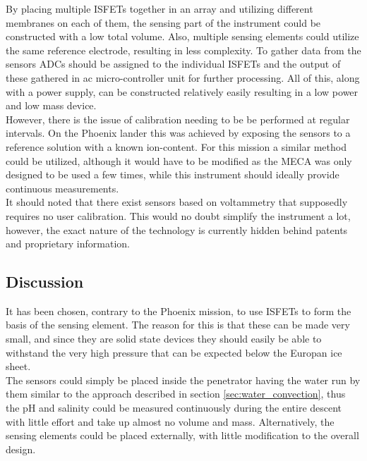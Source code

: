 \noindent
By placing multiple ISFETs together in an array and utilizing different membranes on each of them, the sensing part of the instrument could be constructed with a low total volume. Also, multiple sensing elements could utilize the same reference electrode, resulting in less complexity. To gather data from the sensors ADCs should be assigned to the individual ISFETs and the output of these gathered in ac micro-controller unit for further processing. All of this, along with a power supply, can be constructed relatively easily resulting in a low power and low mass device. \\

\noindent
However, there is the issue of calibration needing to be be performed at regular intervals. On the Phoenix lander this was achieved by exposing the sensors to a reference solution with a known ion-content\cite{article:jgre2487}. For this mission a similar method could be utilized, although it would have to be modified as the MECA was only designed to be used a few times, while this instrument should ideally provide continuous measurements.  \\

\noindent
It should noted that there exist sensors based on voltammetry that supposedly requires no user calibration\cite{website:senova}. This would no doubt simplify the instrument a lot, however, the exact nature of the technology is currently hidden behind patents and proprietary information. 

\subsection{Discussion}

It has been chosen, contrary to the Phoenix mission, to use ISFETs to form the basis of the sensing element. The reason for this is that these can be made very small, and since they are solid state devices they should easily be able to withstand the very high pressure that can be expected below the Europan ice sheet.\\

\noindent
The sensors could simply be placed inside the penetrator having the water run by them similar to the approach described in section \ref{sec:water_convection}, thus the pH and salinity could be measured continuously during the entire descent with little effort and take up almost no volume and mass. Alternatively, the sensing elements could be placed externally, with little modification to the overall design.\\

